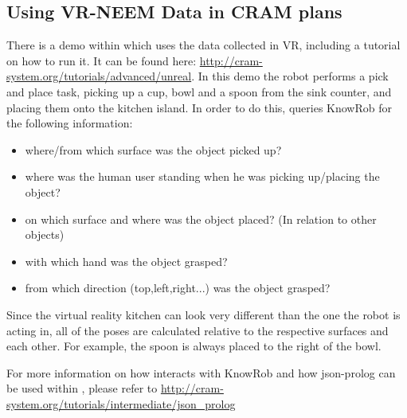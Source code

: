 \subsection{Using VR-NEEM Data in CRAM plans}
There is a demo within \cram which uses the data collected in VR, including a tutorial on how to run it. It can be found here: \url{http://cram-system.org/tutorials/advanced/unreal}. In this demo the robot performs a pick and place task, picking up a cup, bowl and a spoon from the sink counter, and placing them onto the kitchen island. In order to do this, \cram queries KnowRob for the following information: 

\begin{itemize}
	\item where/from which surface was the object picked up?
	\item where was the human user standing when he was picking up/placing the object?
	\item on which surface and where was the object placed? (In relation to other objects)
	\item with which hand was the object grasped?
	\item from which direction (top,left,right...) was the object grasped?
\end{itemize}

Since the virtual reality kitchen can look very different than the one the robot is acting in, all of the poses are calculated relative to the respective surfaces and each other. For example, the spoon is always placed to the right of the bowl. 

For more information on how \cram interacts with KnowRob and how json-prolog can be used within \cram, please refer to \url{http://cram-system.org/tutorials/intermediate/json_prolog}





